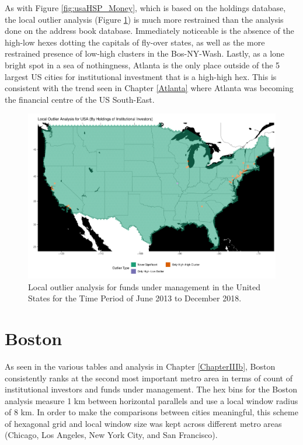 As with Figure \ref{fig:usaHSP_Money}, which is based on the holdings database, the local outlier analysis (Figure \ref{fig:usaloamoney}) is much more restrained than the analysis done on the address book database.  Immediately noticeable is the absence of the high-low hexes dotting the capitals of fly-over states, as well as the more restrained presence of low-high clusters in the Bos-NY-Wash.  Lastly, as a lone bright spot in a sea of nothingness, Atlanta is the only place outside of the 5 largest US cities for institutional investment that is a high-high hex.  This is consistent with the trend seen in Chapter \ref{Atlanta} where Atlanta was becoming the financial centre of the US South-East. 

\begin{figure}
	\centering
	\includegraphics[width=\linewidth]{Figures/ChapterIV/USA_Money_LO}
	\caption[Local Outlier Analysis For Funds Under Management in the United States 2013-2018]{Local outlier analysis for funds under management in the United States for the Time Period of June 2013 to December 2018.}
	\label{fig:usaloamoney}
\end{figure}


\section{Boston}
\label{subsection:Boston}	
As seen in the various tables and analysis in Chapter \ref{ChapterIIIb}, Boston consistently ranks at the second most important metro area in terms of count of institutional investors and funds under management.  The hex bins for the Boston analysis measure 1 km between horizontal parallels and use a local window radius of 8 km.  In order to make the comparisons between cities meaningful, this scheme of hexagonal grid  and local window size was kept across different metro areas (Chicago, Los Angeles, New York City, and San Francisco).  

